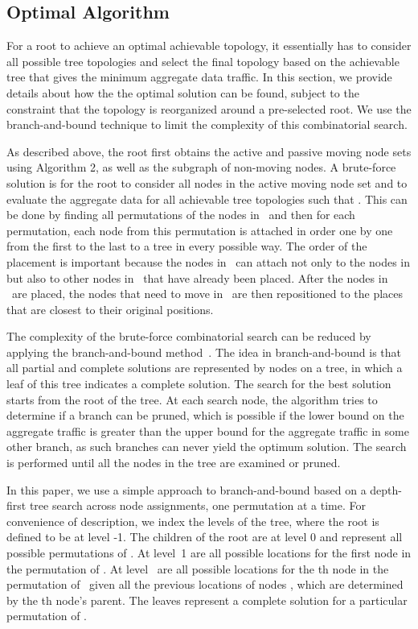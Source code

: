 \documentclass[10pt,conference]{IEEEtran}
\begin{document}
\subsection{Optimal Algorithm}
\label{sec:ea}

For a root to achieve an optimal achievable topology, it essentially
has to consider all possible tree topologies and select the final
topology based on the achievable tree that gives the minimum aggregate
data traffic.  In this section, we provide details about how the
the optimal solution can be found, subject to the constraint that
the topology is reorganized around a pre-selected root.  We use the
branch-and-bound technique to limit the complexity of this
combinatorial search.

As described above, the root first obtains the active and passive
moving node sets using Algorithm 2, as well as the subgraph
 of non-moving nodes.  A brute-force solution is for the
root to consider all nodes in the active moving node set and to
evaluate the aggregate data for all achievable tree topologies
 such that .  This can be done by finding all
permutations of the nodes in \AM\ and then for each permutation, each
node from this permutation is attached in order one by one from the
first to the last to a tree in every possible way.  The order of the
placement is important because the nodes in \AM\ can attach not only
to the nodes in  but also to other nodes in \AM\
that have already been placed.  After the nodes in \AM\ are placed,
the nodes that need to move in \PM\ are then repositioned to the
places that are closest to their original positions.


The complexity of the brute-force combinatorial search can be reduced
by applying the branch-and-bound method~\cite{land60a}.  The idea in
branch-and-bound is that all partial and complete solutions are
represented by nodes on a tree, in which a leaf of this tree indicates
a complete solution.  The search for the best solution starts from the
root of the tree.  At each search node, the algorithm tries to
determine if a branch can be pruned, which is possible if the lower
bound on the aggregate traffic is greater than the upper bound for the
aggregate traffic in some other branch, as such branches can never
yield the optimum solution.  The search is performed until all the
nodes in the tree are examined or pruned.

In this paper, we use a simple approach to branch-and-bound based on a
depth-first tree search across node assignments, one permutation at a
time.  For convenience of description, we index the levels of the
tree, where the root is defined to be at level -1.  The children of
the root are at level 0 and represent all possible permutations of \AM
.  At level~1 are all possible locations for the first node in the
permutation of \AM .  At level~ are all possible locations for the
th node in the permutation of \AM\ given all the previous locations
of nodes , which are determined by the th node's
parent.  The leaves represent a complete solution
 for a particular permutation of \AM .
\end{document}
